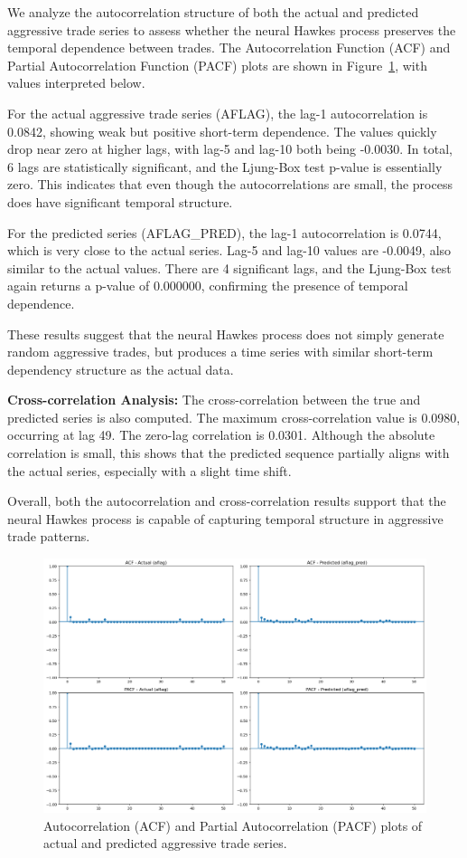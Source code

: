 We analyze the autocorrelation structure of both the actual and predicted aggressive trade series to assess whether the neural Hawkes process preserves the temporal dependence between trades. The Autocorrelation Function (ACF) and Partial Autocorrelation Function (PACF) plots are shown in Figure~\ref{fig:acf-pacf}, with values interpreted below.

For the actual aggressive trade series (AFLAG), the lag-1 autocorrelation is 0.0842, showing weak but positive short-term dependence. The values quickly drop near zero at higher lags, with lag-5 and lag-10 both being -0.0030. In total, 6 lags are statistically significant, and the Ljung-Box test p-value is essentially zero. This indicates that even though the autocorrelations are small, the process does have significant temporal structure.

For the predicted series (AFLAG\_PRED), the lag-1 autocorrelation is 0.0744, which is very close to the actual series. Lag-5 and lag-10 values are -0.0049, also similar to the actual values. There are 4 significant lags, and the Ljung-Box test again returns a p-value of 0.000000, confirming the presence of temporal dependence.

These results suggest that the neural Hawkes process does not simply generate random aggressive trades, but produces a time series with similar short-term dependency structure as the actual data.

\textbf{Cross-correlation Analysis:} The cross-correlation between the true and predicted series is also computed. The maximum cross-correlation value is 0.0980, occurring at lag 49. The zero-lag correlation is 0.0301. Although the absolute correlation is small, this shows that the predicted sequence partially aligns with the actual series, especially with a slight time shift.

Overall, both the autocorrelation and cross-correlation results support that the neural Hawkes process is capable of capturing temporal structure in aggressive trade patterns.

\begin{figure}[H]
    \centering
    \includegraphics[width=0.95\linewidth]{figures/ACF_181330.png}
    \caption{Autocorrelation (ACF) and Partial Autocorrelation (PACF) plots of actual and predicted aggressive trade series.}
    \label{fig:acf-pacf}
\end{figure}

